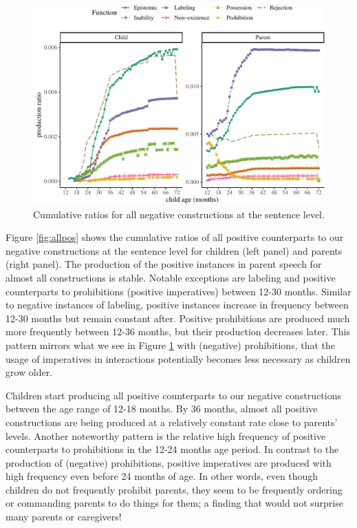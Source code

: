 \documentclass[
  man,floatsintext]{apa6}
\begin{document}
\begin{figure}[H]

{\centering \includegraphics{neg_construction_article_files/figure-latex/allneg-1} 

}

\caption{Cumulative ratios for all negative constructions at the sentence level.}\label{fig:allneg}
\end{figure}

Figure \ref{fig:allpos} shows the cumulative ratios of all positive counterparts to our negative constructions at the sentence level for children (left panel) and parents (right panel). The production of the positive instances in parent speech for almost all constructions is stable. Notable exceptions are labeling and positive counterparts to prohibitions (positive imperatives) between 12-30 months. Similar to negative instances of labeling, positive instances increase in frequency between 12-30 months but remain constant after. Positive prohibitions are produced much more frequently between 12-36 months, but their production decreases later. This pattern mirrors what we see in Figure \ref{fig:allneg} with (negative) prohibitions, that the usage of imperatives in interactions potentially becomes less necessary as children grow older.

Children start producing all positive counterparts to our negative constructions between the age range of 12-18 months. By 36 months, almost all positive constructions are being produced at a relatively constant rate close to parents' levels. Another noteworthy pattern is the relative high frequency of positive counterparts to prohibitions in the 12-24 months age period. In contrast to the production of (negative) prohibitions, positive imperatives are produced with high frequency even before 24 months of age. In other words, even though children do not frequently prohibit parents, they seem to be frequently ordering or commanding parents to do things for them; a finding that would not surprise many parents or caregivers!
\end{document}

